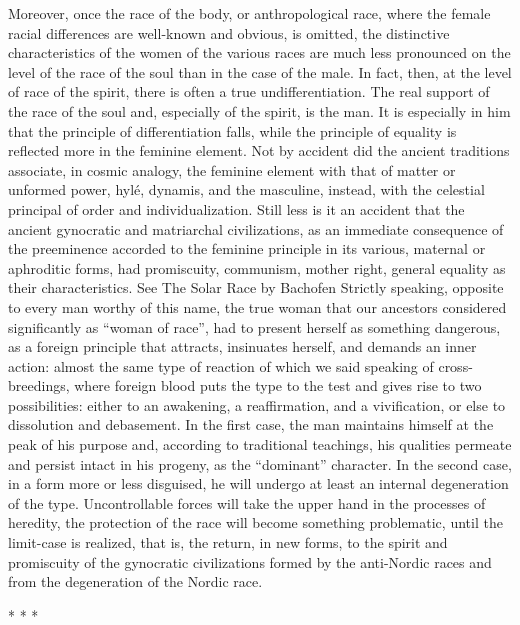 Moreover, once the race of the body, or anthropological race, where the female racial differences are well-known and obvious, is omitted, the distinctive characteristics of the women of the various races are much less pronounced on the level of the race of the soul than in the case of the male. In fact, then, at the level of race of the spirit, there is often a true undifferentiation. The real support of the race of the soul and, especially of the spirit, is the man. It is especially in him that the principle of differentiation falls, while the principle of equality is reflected more in the feminine element. Not by accident did the ancient traditions associate, in cosmic analogy, the feminine element with that of matter or unformed power, hylé, dynamis, and the masculine, instead, with the celestial principal of order and individualization. Still less is it an accident that the ancient gynocratic and matriarchal civilizations, as an immediate consequence of the preeminence accorded to the feminine principle in its various, maternal or aphroditic forms, had promiscuity, communism, mother right, general equality as their characteristics. See The Solar Race by Bachofen Strictly speaking, opposite to every man worthy of this name, the true woman that our ancestors considered significantly as ``woman of race'', had to present herself as something dangerous, as a foreign principle that attracts, insinuates herself, and demands an inner action: almost the same type of reaction of which we said speaking of cross-breedings, where foreign blood puts the type to the test and gives rise to two possibilities: either to an awakening, a reaffirmation, and a vivification, or else to dissolution and debasement. In the first case, the man maintains himself at the peak of his purpose and, according to traditional teachings, his qualities permeate and persist intact in his progeny, as the ``dominant'' character. In the second case, in a form more or less disguised, he will undergo at least an internal degeneration of the type. Uncontrollable forces will take the upper hand in the processes of heredity, the protection of the race will become something problematic, until the limit-case is realized, that is, the return, in new forms, to the spirit and promiscuity of the gynocratic civilizations formed by the anti-Nordic races and from the degeneration of the Nordic race.



\begin{center}* * *\end{center}

